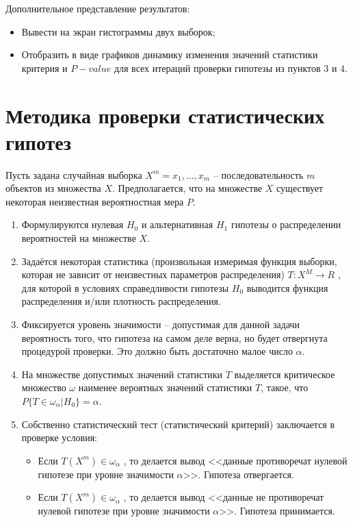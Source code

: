\documentclass[12pt]{report}
\begin{document}
Дополнительное представление результатов:
\begin{itemize}
    \item Вывести на экран гистограммы двух выборок; 
    \item Отобразить в виде графиков динамику изменения значений статистики критерия и $P-value$ для всех итераций проверки гипотезы из пунктов 3 и 4.

\end{itemize}
	

\section{Методика проверки статистических гипотез}
Пусть задана случайная выборка $X^m = x_1,…,x_m$ -- последовательность $m$ объектов из множества $X$. Предполагается, что на множестве $X$ существует некоторая неизвестная вероятностная мера $Ρ$.
\begin{enumerate}
    \item Формулируются нулевая $H_0$ и альтернативная $H_1$ гипотезы о распределении вероятностей на множестве $X$.
    \item Задаётся некоторая статистика (произвольная измеримая функция выборки, которая не зависит от неизвестных параметров распределения) $T:X^M  \longrightarrow R$ , для которой в условиях справедливости гипотезы $H_0$ выводится функция распределения и/или плотность распределения.
    \item Фиксируется уровень значимости -- допустимая для данной задачи вероятность того, что гипотеза на самом деле верна, но будет отвергнута процедурой проверки. Это должно быть достаточно малое число $\alpha$.
    \item На множестве допустимых значений статистики $T$ выделяется критическое множество $\omega$ наименее вероятных значений статистики $T$, такое, что $P \{T \in \omega_\alpha | H_0\} = \alpha$.
    \item Собственно статистический тест (статистический критерий) заключается в проверке условия:
    \begin{itemize}
        \item Если $T(X^m) \in \omega_\alpha$ , то делается вывод <<данные противоречат нулевой гипотезе при уровне значимости $\alpha$>>. Гипотеза отвергается.
        \item  Если $T(X^m) \in \omega_\alpha$ ,  то делается вывод <<данные не противоречат нулевой гипотезе при уровне значимости $\alpha$>>. Гипотеза принимается. 
    \end{itemize}
\end{enumerate}
\end{document}
